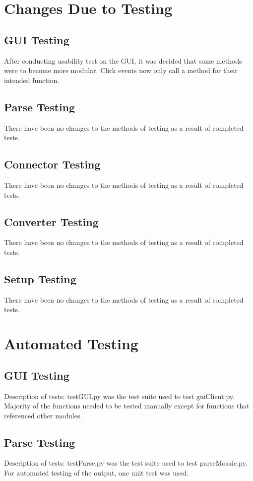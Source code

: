 \documentclass[12pt, titlepage]{article}
\begin{document}
\FloatBarrier %
\section{Changes Due to Testing}
	\subsection{GUI Testing}
	After conducting usability test on the GUI, it was decided that some methods were to become more modular. Click events now only call a method for their intended function.
	\subsection{Parse Testing}
  There have been no changes to the methods of testing as a result of completed tests. 
	\subsection{Connector Testing}
  There have been no changes to the methods of testing as a result of completed tests. 
	\subsection{Converter Testing}
  There have been no changes to the methods of testing as a result of completed tests. 
  \subsection{Setup Testing}
  There have been no changes to the methods of testing as a result of completed tests. 

\section{Automated Testing}
	\subsection{GUI Testing}
		Description of tests: testGUI.py was the test suite used to test guiClient.py. Majority of the functions needed to be tested manually except for functions that referenced other modules.
	\subsection{Parse Testing}
		Description of tests: testParse.py was the test suite used to test parseMosaic.py. For automated testing of the output, one unit test was used.
\end{document}
